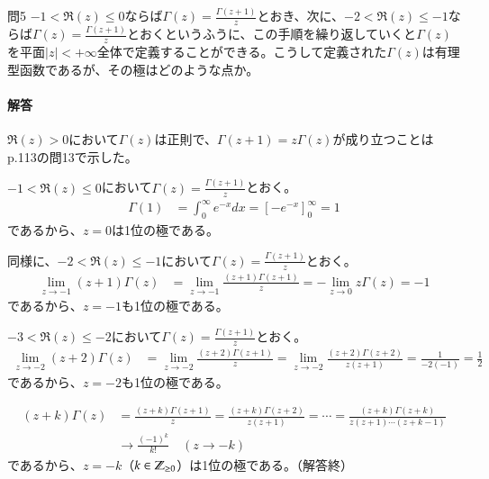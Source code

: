 \begin{mysimplebox}{問5}
    $-1<\Re(z)\le0$ならば$\Gamma(z)=\frac{\Gamma(z+1)}{z}$とおき、次に、$-2<\Re(z)\le-1$ならば$\Gamma(z)=\frac{\Gamma(z+1)}{z}$とおくというふうに、この手順を繰り返していくと$\Gamma(z)$を平面$|z|<+\infty$全体で定義することができる。こうして定義された$\Gamma(z)$は有理型函数であるが、その極はどのような点か。
\end{mysimplebox}
\paragraph{解答}
$\Re(z)>0$において$\Gamma(z)$は正則で、$\Gamma(z+1)=z\Gamma(z)$が成り立つことはp.113の問13で示した。

$-1<\Re(z)\le0$において$\Gamma(z)=\frac{\Gamma(z+1)}{z}$とおく。
\begin{align*}
    \Gamma(1)
    &=\int_{0}^{\infty}e^{-x}dx=\left[-e^{-x}\right]_0^\infty=1
\end{align*}
であるから、$z=0$は1位の極である。

同様に、$-2<\Re(z)\le-1$において$\Gamma(z)=\frac{\Gamma(z+1)}{z}$とおく。
\begin{align*}
    \lim_{z\longrightarrow-1}(z+1)\Gamma(z)
    &=\lim_{z\longrightarrow-1}\frac{(z+1)\Gamma(z+1)}{z}
    =-\lim_{z\longrightarrow0}z\Gamma(z)=-1
\end{align*}
であるから、$z=-1$も1位の極である。

$-3<\Re(z)\le-2$において$\Gamma(z)=\frac{\Gamma(z+1)}{z}$とおく。
\begin{align*}
    \lim_{z\longrightarrow-2}(z+2)\Gamma(z)
    &=\lim_{z\longrightarrow-2}\frac{(z+2)\Gamma(z+1)}{z}
    =\lim_{z\longrightarrow-2}\frac{(z+2)\Gamma(z+2)}{z(z+1)}=\frac{1}{-2(-1)}=\frac{1}{2}
\end{align*}
であるから、$z=-2$も1位の極である。

\begin{align*}
    (z+k)\Gamma(z)
    &=\frac{(z+k)\Gamma(z+1)}{z}
    =\frac{(z+k)\Gamma(z+2)}{z(z+1)}
    =\cdots=\frac{(z+k)\Gamma(z+k)}{z(z+1)\cdots(z+k-1)}\\
    &\longrightarrow \frac{(-1)^k}{k!}\quad(z\longrightarrow-k)
\end{align*}
であるから、$z=-k$（$k\in\mathbb{Z}_{\ge0}$）は1位の極である。（解答終）